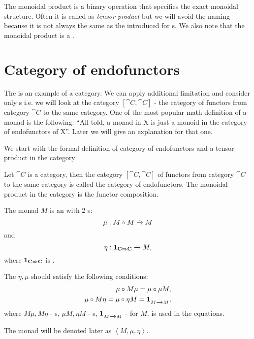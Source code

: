 \begin{remark}
\label{rem:monoidal_product}
The monoidal product is a binary operation that specifies the exact
monoidal structure. Often it is called as \textit{tensor product} but
we will avoid the naming because it is not always the same as the
 introduced for
s. We also note that the monoidal product is
a . 
\end{remark}

\section{Category of endofunctors}

The  is an example of a category. We can
apply additional limitation and consider only
s i.e. we will look at the category
$[\cat{C}, \cat{C}]$ - the category of functors from category $\cat{C}$ to
the same category. One of the most popular math definition of a monad
is the following: 
``All told, a monad in X is just a monoid in the category of
endofunctors of X''\cite{bib:maclane98}.
Later we will give an explanation for that one.

We start with the formal definition of category of endofunctors and a
tensor product in the category
\begin{definition}
\label{def:category_of_endofunctors}
Let $\cat{C}$ is a category, then  the category $[\cat{C}, \cat{C}]$ of
functors from category $\cat{C}$ to the same category is called the
category of endofunctors. The monoidal product in the category is the
functor composition. 
\end{definition}

\begin{definition}[Monad]
  \label{def:monad}
  The monad $M$ is an  with 2
  s:
  \begin{equation}
    \label{eq:monad_mu}
    \mu: M \circ M \xrightarrow{.} M
  \end{equation}
  and
  \begin{equation}
    \label{eq:monad_eta}
    \eta: \mathbf{1}_{ \mathbf{C} \Rightarrow \mathbf{C} } \xrightarrow{.} M,
  \end{equation}
  where $\mathbf{1}_{ \mathbf{C} \Rightarrow \mathbf{C} }$ is .

  The $\eta, \mu$ should satisfy the following conditions:
  \begin{eqnarray}
    \mu \circ M \mu = \mu \circ \mu M, 
    \nonumber \\
    \mu \circ M \eta = \mu \circ \eta M = \mathbf{1}_{ M \xrightarrow{.} M },
    \label{eq:monad}
  \end{eqnarray}
  where $M \mu, M \eta$ - s, $\mu M, \eta M$ -
  s, $\mathbf{1}_{ M \xrightarrow{.} M }$ -  for $M$.
   is used in the equations.

  The monad will be denoted later as $\left<M, \mu, \eta\right>$.
\end{definition}

